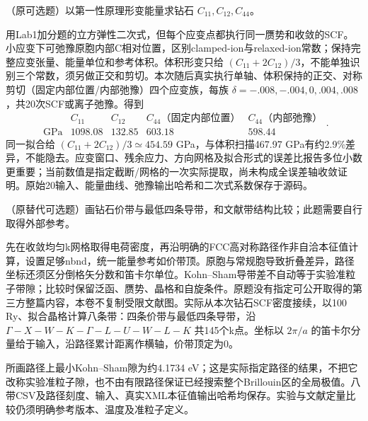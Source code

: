 \begin{exercise}\label{task:lab2-extra-elastic}
（原可选题）以第一性原理形变能量求钻石 $C_{11},C_{12},C_{44}$。
\end{exercise}
\begin{solution}
用Lab1加分题的立方弹性二次式，但每个应变点都执行同一赝势和收敛的SCF。小应变下可弛豫原胞内部C相对位置，区别clamped-ion与relaxed-ion常数；保持完整应变张量、能量单位和参考体积。体积形变只给 $(C_{11}+2C_{12})/3$，不能单独识别三个常数，须另做正交和剪切。本次随后真实执行单轴、体积保持的正交、对称剪切（固定内部位置/内部弛豫）四个应变族，每族 $\delta=-.008,-.004,0,.004,.008$，共20次SCF或离子弛豫。得到
\[
\begin{array}{c|rrrr}
&C_{11}&C_{12}&C_{44}\text{（固定内部位置）}&C_{44}\text{（内部弛豫）}\\\hline
\text{GPa}&1098.08&132.85&603.18&598.44
\end{array}.
\]
同一拟合给 $(C_{11}+2C_{12})/3\simeq454.59$ GPa，与体积扫描467.97 GPa有约2.9\%差异，不能隐去。应变窗口、残余应力、方向网格及拟合形式的误差比报告多位小数更重要；当前数值是指定截断/网格的一次实际提取，尚未构成全误差轴收敛证明。原始20输入、能量曲线、弛豫输出哈希和二次式系数保存于源码。
\end{solution}

\begin{exercise}\label{task:lab2-extra-band}
（原替代可选题）画钻石价带与最低四条导带，和文献带结构比较；此题需要自行取得外部参考。
\end{exercise}
\begin{solution}
先在收敛均匀k网格取得电荷密度，再沿明确的FCC高对称路径作非自洽本征值计算，设置足够nbnd，统一能量参考如价带顶。原胞与常规胞导致折叠差异，路径坐标还须区分倒格矢分数和笛卡尔单位。Kohn--Sham导带差不自动等于实验准粒子带隙；比较时保留泛函、赝势、晶格和自旋条件。原题没有指定可公开取得的第三方整篇内容，本卷不复制受限文献图。实际从本次钻石SCF密度接续，以100 Ry、拟合晶格计算八条带：四条价带与最低四条导带，沿 $\Gamma-X-W-K-\Gamma-L-U-W-L-K$ 共145个k点。坐标以 $2\pi/a$ 的笛卡尔分量给于输入，沿路径累计距离作横轴，价带顶定为0。
\begin{center}\end{center}
所画路径上最小Kohn--Sham隙为约4.1734 eV；这是实际指定路径的结果，不把它改称实验准粒子隙，也不由有限路径保证已经搜索整个Brillouin区的全局极值。八带CSV及路径刻度、输入、真实XML本征值输出哈希均保存。实验与文献定量比较仍须明确参考版本、温度及准粒子定义。
\end{solution}
